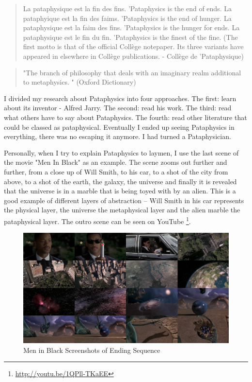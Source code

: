 \begin{quote}
  La pataphysique est la fin des fins.    		  'Pataphysics is the end of ends.
  La pataphyique est la fin des faims.                         'Pataphysics is the end of hunger.
  La pataphysique est la faim des fins.                    'Pataphysics is the hunger for ends.
  La pataphysique est le fin du fin.                          'Pataphysics is the finest of the fine.
  (The first motto is that of the official Collège notepaper. Its three variants have appeared in elsewhere in Collège publications. - Collège de 'Pataphysique) \citep{Brotchie2003}
\end{quote}

\begin{quote}
  "The branch of philosophy that deals with an imaginary realm additional to metaphysics. " (Oxford Dictionary)
\end{quote}

I divided my research about Pataphysics into four approaches. The first: learn about its inventor - Alfred Jarry. The second: read his work. The third: read what others have to say about Pataphysics. The fourth: read other literature that could be classed as pataphysical. Eventually I ended up seeing Pataphysics in everything, there was no escaping it anymore. I had turned a Pataphysician.

Personally, when I try to explain Pataphysics to laymen, I use the last scene of the movie "Men In Black" as an example. The scene zooms out further and further, from a close up of Will Smith, to his car, to a shot of the city from above, to a shot of the earth, the galaxy, the universe and finally it is revealed that the universe is in a marble that is being toyed with by an alien. This is a good example of different layers of abstraction – Will Smith in his car represents the physical layer, the universe the metaphysical layer and the alien marble the pataphysical layer. The outro scene can be seen on YouTube \footnote{\url{http://youtu.be/1QPll-TKaEE}}.

\begin{figure}[htb] %
  \centering
  \includegraphics[width=\linewidth]{images/mib}
  \caption[Men in Black]{Men in Black Screenshots of Ending Sequence}
  \label{fig:MIB}
\end{figure}


